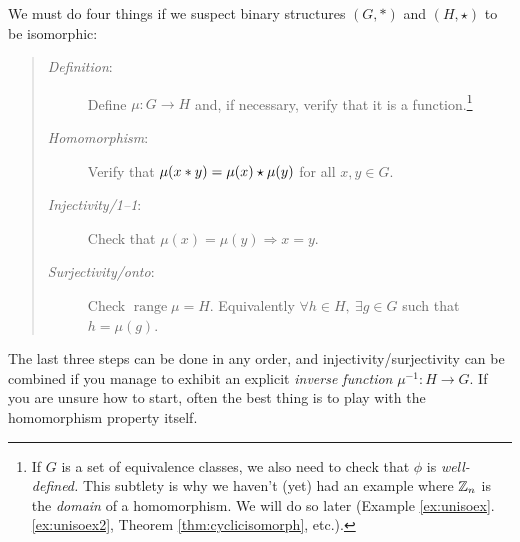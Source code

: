 \vspace{-5pt}

\label{sec:estisom}

We must do four things if we suspect binary structures $(G,*)$ and $(H,\star)$ to be isomorphic:
\begin{quote}
	\begin{description}
		\item[\emph{Definition}:] Define $\mu:G\to H$ and, if necessary, verify that it is a function.\footnote{%
			If $G$ is a set of equivalence classes, we also need to check that $\phi$ is \emph{well-defined.} This subtlety is why we haven't (yet) had an example where $\mathbb{Z}_n$ is the \emph{domain} of a homomorphism. We will do so later (Example \ref*{ex:unisoex}.\ref{ex:unisoex2}, Theorem \ref{thm:cyclicisomorph}, etc.).
			}
		\item[\emph{Homomorphism}:] Verify that $\mu(x\mathbin{\ast} y)=\mu(x)\mathbin{\star}\mu(y)$ for all $x,y\in G$.
		\item[\emph{Injectivity/1--1}:] Check that $\mu(x)=\mu(y)\Longrightarrow x=y$.
		\item[\emph{Surjectivity/onto}:] Check $\operatorname{range}\mu=H$. Equivalently $\forall h\in H,\ \exists g\in G$ such that $h=\mu(g)$.
	\end{description}
\end{quote}

The last three steps can be done in any order, and injectivity/surjectivity can be combined if you manage to exhibit an explicit \emph{inverse function} $\mu^{-1}:H\to G$. If you are unsure how to start, often the best thing is to play with the homomorphism property itself.


